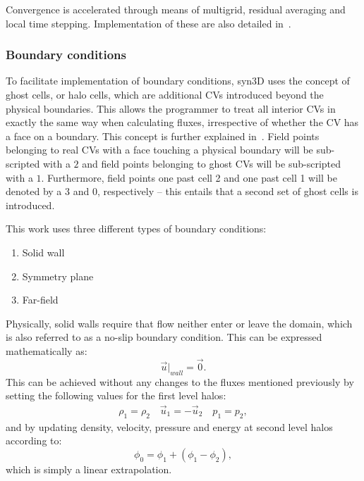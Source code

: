 Convergence is accelerated through means of multigrid, residual averaging and local time stepping. Implementation of these are also detailed in~\cite{nadarajah2003discrete}.
%
\subsubsection{Boundary conditions}
%
To facilitate implementation of boundary conditions, syn3D uses the concept of ghost cells, or halo cells, which are additional CVs introduced beyond the physical boundaries. This allows the programmer to treat all interior CVs in exactly the same way when calculating fluxes, irrespective of whether the CV has a face on a boundary. This concept is further explained in~\cite{blazek2015computational}. Field points belonging to real CVs with a face touching a physical boundary will be sub-scripted with a $2$ and field points belonging to ghost CVs will be sub-scripted with a $1$. Furthermore, field points one past cell 2 and one past cell 1 will be denoted by a 3 and 0, respectively -- this entails that a second set of ghost cells is introduced.

This work uses three different types of boundary conditions:
\begin{enumerate}
    \item Solid wall
    \item Symmetry plane
    \item Far-field
\end{enumerate}

Physically, solid walls require that flow neither enter or leave the domain, which is also referred to as a no-slip boundary condition. This can be expressed mathematically as:
\begin{equation*}
    \vec{u}|_{wall} = \vec{0}.
\end{equation*}
This can be achieved without any changes to the fluxes mentioned previously by setting the following values for the first level halos:
\begin{gather*}
    \rho_1 = \rho_2 \quad \vec{u}_1 = -\vec{u}_2 \quad p_1 = p_2,
\end{gather*}
and by updating density, velocity, pressure and energy at second level halos according to:
\begin{equation*}
    \phi_0 = \phi_1 + \left(\phi_1 - \phi_2\right),
\end{equation*}
which is simply a linear extrapolation.

